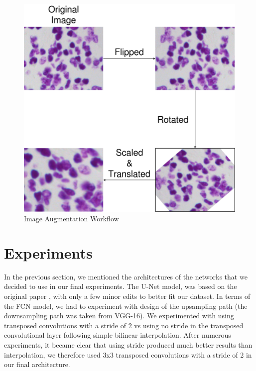 \documentclass{article}
\begin{document}
\begin{figure}[htbp]
\vskip 5mm
\begin{center}
\centerline{\includegraphics[scale=0.25]{mlp-cw3-template/Figures/AugmentationWorkflow.png}}
\caption{Image Augmentation Workflow}
\label{fig:ImgAugWorkflow}
\end{center}
\vskip -5mm
\end{figure} 

\section{Experiments}
\label{sec:expts}
In the previous section, we mentioned the architectures of the networks that we decided to use in our final experiments. The U-Net model, was based on the original paper \cite{Ronneberger2015UNetCN}, with only a few minor edits to better fit our dataset. In terms of the FCN model, we had to experiment with design of the upsampling path (the downsampling path was taken from VGG-16). We experimented with using transposed convolutions with a stride of 2 vs using no stride in the transposed convolutional layer following simple bilinear interpolation. After numerous experiments, it became clear that using stride produced much better results than interpolation, we therefore used 3x3 transposed convolutions with a stride of 2 in our final architecture.
\end{document}
